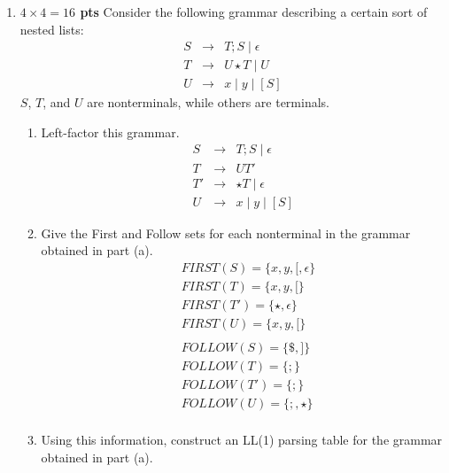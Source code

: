 \documentclass[10pt]{article}
\newcommand {\pts}[1]{{\bf #1 pts}}
\begin{document}
\begin{enumerate}
\begin{center}
\begin{tikzpicture}
        \end{tikzpicture}\end{center}

\newpage
\item \pts{$4\times 4 =16$} Consider the following grammar describing a certain sort of nested lists:
\[\begin{array}{cll}
S & \rightarrow & T;S \mid \epsilon \\
T & \rightarrow & U\star T \mid U \\
U & \rightarrow & x\mid y\mid [S]
\end{array}\]
$S$, $T$, and $U$ are nonterminals, while others are terminals.
\begin{enumerate}
  \item Left-factor this grammar.
		\[\begin{array}{cll}
		S & \rightarrow & T;S \mid \epsilon \\
		T & \rightarrow & UT'  \\
		T' & \rightarrow & \star T \mid \epsilon\\
		U & \rightarrow & x\mid y\mid [S]
		\end{array}\]
  \item Give the First and Follow sets for each nonterminal in the grammar obtained in part (a).
            \begin{equation*}\begin{aligned}
			& FIRST(S) = \{x, y, [, \epsilon\} \\
			& FIRST(T) = \{x, y, [\} \\
			& FIRST(T') = \{\star, \epsilon\} \\
			& FIRST(U) = \{x, y, [\} \\
			& \\
			& FOLLOW(S) = \{\$, ]\} \\
			& FOLLOW(T) = \{;\} \\
			& FOLLOW(T') = \{;\} \\
			& FOLLOW(U) = \{;, \star\} \\
            \end{aligned}\end{equation*}
  \item Using this information, construct an LL(1) parsing table for the grammar obtained in part (a).


\end{enumerate}
\end{enumerate}
\end{document}
